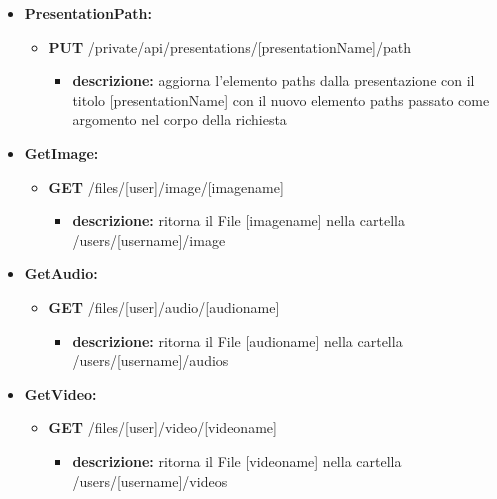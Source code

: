 {\begin{itemize}
		\item \textbf{PresentationPath:}
			\begin{itemize}
			\item   \textbf{PUT} /private/api/presentations/[presentationName]/path
				\begin{itemize} 
				\item \textbf{descrizione:} aggiorna l'elemento paths dalla presentazione con il titolo [presentationName]  con il nuovo elemento paths passato come argomento nel corpo della richiesta						
				\end{itemize}
			\end{itemize}
			
			
		\item \textbf{GetImage:}
			\begin{itemize}
			\item    \textbf{GET} /files/[user]/image/[imagename]
				\begin{itemize} 
				\item \textbf{descrizione:} ritorna il File nella cartella /users/[username]/image				\end{itemize}
			\end{itemize}
			
		\item \textbf{GetAudio:}
			\begin{itemize}
			\item    \textbf{GET} /files/[user]/audio/[audioname]
				\begin{itemize} 
				\item \textbf{descrizione:} ritorna il File nella cartella /users/[username]/audios				\end{itemize}		
			\end{itemize}
			
		\item \textbf{GetVideo:}
			\begin{itemize}
			\item    \textbf{GET} /files/[user]/video/[videoname]
				\begin{itemize} 
				\item \textbf{descrizione:} ritorna il File nella cartella /users/[username]/videos					
				\end{itemize}
			\end{itemize}
	

\end{itemize}}
